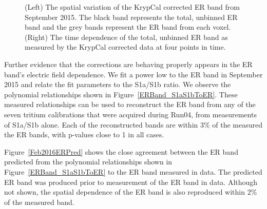 
\begin{figure} 
\centering
{}
\qquad
{}
\caption{ (Left) The spatial variation of the KrypCal corrected ER band from September 2015.  The black band represents the total, unbinned ER band and the grey bands represent the ER band from each voxel. (Right) The time dependence of the total, unbinned ER band as measured by the KrypCal corrected data at four points in time.}
\label{ERBandVariation}
\end{figure}

Further evidence that the corrections are behaving properly appears in the ER band's electric field dependence.  We fit a power low to the ER band in September 2015 and relate the fit parameters to the S1a/S1b ratio.  We observe the polynomial relationships shown in Figure~\ref{ERBand_S1aS1bToER}.  These measured relationships can be used to reconstruct the ER band from any of the seven tritium calibrations that were acquired during Run04, from measurements of S1a/S1b alone.  Each of the reconstructed bands are within 3\% of the measured the ER bands, with p-values close to 1 in all cases.  

Figure~\ref{Feb2016ERPred} shows the close agreement between the ER band predicted from the polynomial relationships shown in Figure~\ref{ERBand_S1aS1bToER} to the ER band measured in data.  The predicted ER band was produced prior to measurement of the ER band in data.  Although not shown, the spatial dependence of the ER band is also reproduced within 2\% of the measured band. 


